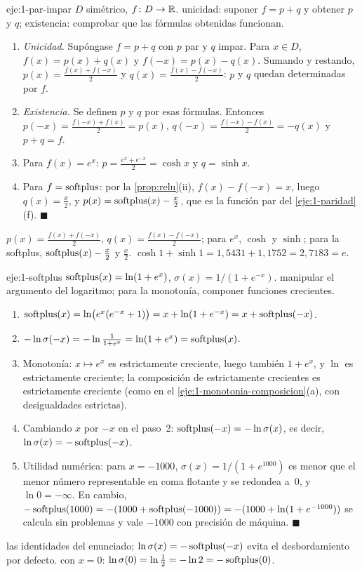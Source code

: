 \begin{solucion}{eje:1-par-impar}
\datos $D$ simétrico, $f\colon D\to\mathbb{R}$.
\planteamiento unicidad: suponer $f=p+q$ y obtener $p$ y $q$; existencia: comprobar que las fórmulas obtenidas funcionan.
\pasos
\begin{enumerate}[label=\arabic*.]
  \item \emph{Unicidad.} Supóngase $f=p+q$ con $p$ par y $q$ impar. Para $x\in D$, $f(x)=p(x)+q(x)$ y $f(-x)=p(x)-q(x)$. Sumando y restando, $p(x)=\frac{f(x)+f(-x)}{2}$ y $q(x)=\frac{f(x)-f(-x)}{2}$: $p$ y $q$ quedan determinadas por $f$.
  \item \emph{Existencia.} Se definen $p$ y $q$ por esas fórmulas. Entonces $p(-x)=\frac{f(-x)+f(x)}{2}=p(x)$, $q(-x)=\frac{f(-x)-f(x)}{2}=-q(x)$ y $p+q=f$.
  \item Para $f(x)=e^{x}$: $p=\frac{e^{x}+e^{-x}}{2}=\cosh x$ y $q=\sinh x$.
  \item Para $f=\operatorname{softplus}$: por la \cref{prop:relu}(ii), $f(x)-f(-x)=x$, luego $q(x)=\frac x2$, y $p(x)=\operatorname{softplus}(x)-\frac x2$, que es la función par del \cref{eje:1-paridad}(f). \hfill$\blacksquare$
\end{enumerate}
\resultado $p(x)=\frac{f(x)+f(-x)}{2}$, $q(x)=\frac{f(x)-f(-x)}{2}$; para $e^{x}$, $\cosh$ y $\sinh$; para la softplus, $\operatorname{softplus}(x)-\frac x2$ y $\frac x2$.
\comprobacion $\cosh1+\sinh1=1{,}5431+1{,}1752=2{,}7183=e$.
\end{solucion}

\begin{solucion}{eje:1-softplus}
\datos $\operatorname{softplus}(x)=\ln(1+e^{x})$, $\sigma(x)=1/(1+e^{-x})$.
\planteamiento manipular el argumento del logaritmo; para la monotonía, componer funciones crecientes.
\pasos
\begin{enumerate}[label=\arabic*.]
  \item $\operatorname{softplus}(x)=\ln\bigl(e^{x}(e^{-x}+1)\bigr)=x+\ln(1+e^{-x})=x+\operatorname{softplus}(-x)$.
  \item $-\ln\sigma(-x)=-\ln\frac{1}{1+e^{x}}=\ln(1+e^{x})=\operatorname{softplus}(x)$.
  \item Monotonía: $x\mapsto e^{x}$ es estrictamente creciente, luego también $1+e^{x}$, y $\ln$ es estrictamente creciente; la composición de estrictamente crecientes es estrictamente creciente (como en el \cref{eje:1-monotonia-composicion}(a), con desigualdades estrictas).
  \item Cambiando $x$ por $-x$ en el paso~2: $\operatorname{softplus}(-x)=-\ln\sigma(x)$, es decir, $\ln\sigma(x)=-\operatorname{softplus}(-x)$.
  \item Utilidad numérica: para $x=-1000$, $\sigma(x)=1/(1+e^{1000})$ es menor que el menor número representable en coma flotante y se redondea a~0, y $\ln0=-\infty$. En cambio, $-\operatorname{softplus}(1000)=-(1000+\operatorname{softplus}(-1000))=-(1000+\ln(1+e^{-1000}))$ se calcula sin problemas y vale $-1000$ con precisión de máquina. \hfill$\blacksquare$
\end{enumerate}
\resultado las identidades del enunciado; $\ln\sigma(x)=-\operatorname{softplus}(-x)$ evita el desbordamiento por defecto.
\comprobacion con $x=0$: $\ln\sigma(0)=\ln\frac12=-\ln2=-\operatorname{softplus}(0)$.
\end{solucion}
